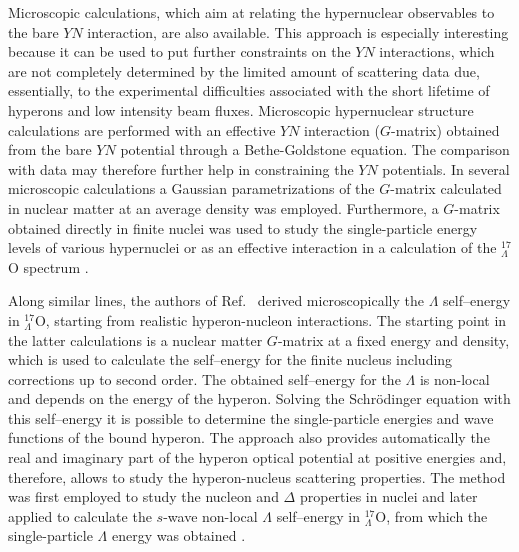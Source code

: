Microscopic calculations, which aim at relating the hypernuclear
observables to the bare $YN$ interaction, are also available. This
approach is especially interesting because it can be used to put
further constraints on the $YN$ interactions, which are not completely
determined by the limited amount of scattering data due, essentially,
to the
experimental difficulties associated with the short lifetime of hyperons
and low intensity beam fluxes. Microscopic hypernuclear structure
calculations are performed with an effective $YN$ interaction ($G$-matrix)
obtained from the bare $YN$ potential through a
Bethe-Goldstone equation. The comparison with data may therefore further help in
constraining the $YN$ potentials.
In several microscopic calculations a Gaussian
parametrizations of the $G$-matrix calculated in nuclear matter at an
average density \cite{yama85,yama90,yama92,yama94} was employed. 
Furthermore, a $G$-matrix obtained directly in finite nuclei was used to
study the single-particle energy levels of various hypernuclei
\cite{hald93} or as an effective interaction in a calculation of the 
$^{17}_{\Lambda}$O spectrum \cite{hao93}.

Along similar lines, the authors of Ref.\ \cite{hjort96}
derived microscopically  the $\Lambda$ self--energy in $^{17}_{\Lambda}$O,
starting from realistic hyperon-nucleon interactions. 
The starting point in the latter calculations 
is a nuclear matter $G$-matrix at a fixed
energy and density, which is used to calculate the self--energy for the
finite nucleus including corrections up to second order. 
The obtained self--energy for the $\Lambda$ 
is non-local and depends on the energy of the hyperon. Solving
the Schr\"{o}dinger equation with this self--energy it is possible to 
determine the single-particle energies and wave functions of the bound
hyperon. The approach also provides automatically
the real and imaginary part of the hyperon optical potential
at positive energies and, therefore,
allows to study the hyperon-nucleus scattering properties.
The method was first
employed to study the nucleon and $\Delta$ properties in nuclei
\cite{bbmp92,hmp94} and later applied to calculate the $s$-wave
non-local $\Lambda$ self--energy in $^{17}_{\Lambda}$O, 
from which the single-particle
$\Lambda$ energy was obtained \cite{hjort96}.

